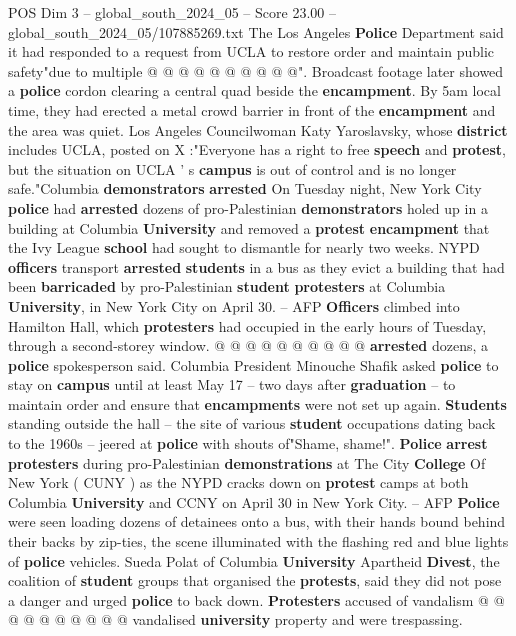 \begin{textsample}{POS Dim 3 – global\_south\_2024\_05 – Score 23.00 – global\_south\_2024\_05/107885269.txt}
The Los Angeles \textbf{Police} Department said it had responded to a request from UCLA to restore order and maintain public safety"due to multiple @ @ @ @ @ @ @ @ @ @".
Broadcast footage later showed a \textbf{police} cordon clearing a central quad beside the \textbf{encampment}.
By 5am local time, they had erected a metal crowd barrier in front of the \textbf{encampment} and the area was quiet.
Los Angeles Councilwoman Katy Yaroslavsky, whose \textbf{district} includes UCLA, posted on X :"Everyone has a right to free \textbf{speech} and \textbf{protest}, but the situation on UCLA ' s \textbf{campus} is out of control and is no longer safe."Columbia \textbf{demonstrators} \textbf{arrested} On Tuesday night, New York City \textbf{police} had \textbf{arrested} dozens of pro-Palestinian \textbf{demonstrators} holed up in a building at Columbia \textbf{University} and removed a \textbf{protest} \textbf{encampment} that the Ivy League \textbf{school} had sought to dismantle for nearly two weeks.
NYPD \textbf{officers} transport \textbf{arrested} \textbf{students} in a bus as they evict a building that had been \textbf{barricaded} by pro-Palestinian \textbf{student} \textbf{protesters} at Columbia \textbf{University}, in New York City on April 30. -- AFP \textbf{Officers} climbed into Hamilton Hall, which \textbf{protesters} had occupied in the early hours of Tuesday, through a second-storey window. @ @ @ @ @ @ @ @ @ @ \textbf{arrested} dozens, a \textbf{police} spokesperson said.
Columbia President Minouche Shafik asked \textbf{police} to stay on \textbf{campus} until at least May 17 -- two days after \textbf{graduation} -- to maintain order and ensure that \textbf{encampments} were not set up again. \textbf{Students} standing outside the hall -- the site of various \textbf{student} occupations dating back to the 1960s -- jeered at \textbf{police} with shouts of"Shame, shame!". \textbf{Police} \textbf{arrest} \textbf{protesters} during pro-Palestinian \textbf{demonstrations} at The City \textbf{College} Of New York ( CUNY ) as the NYPD cracks down on \textbf{protest} camps at both Columbia \textbf{University} and CCNY on April 30 in New York City. -- AFP \textbf{Police} were seen loading dozens of detainees onto a bus, with their hands bound behind their backs by zip-ties, the scene illuminated with the flashing red and blue lights of \textbf{police} vehicles.
Sueda Polat of Columbia \textbf{University} Apartheid \textbf{Divest}, the coalition of \textbf{student} groups that organised the \textbf{protests}, said they did not pose a danger and urged \textbf{police} to back down. \textbf{Protesters} accused of vandalism @ @ @ @ @ @ @ @ @ @ vandalised \textbf{university} property and were trespassing.

\end{textsample}
